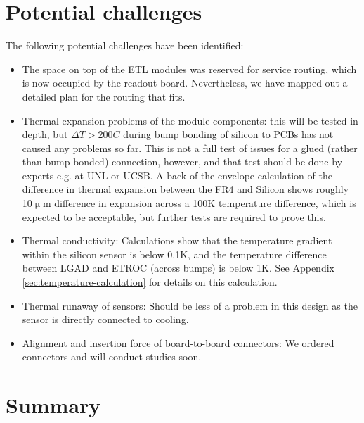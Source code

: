 \documentclass[11pt]{article}
\begin{document}
\section{Potential challenges}

The following potential challenges have been identified:
\begin{itemize}
  \item The space on top of the ETL modules was reserved for service routing, which is now occupied by the readout board. Nevertheless, we have mapped out a detailed plan for the routing that fits.
  \item Thermal expansion problems of the module components: this will be tested in depth, but $\Delta T > 200C$ during bump bonding of silicon to PCBs has not caused any problems so far. This is not a full test of issues for a glued (rather than bump bonded) connection, however, and that test should be done by experts e.g. at UNL or UCSB. A back of the envelope calculation of the difference in thermal expansion between the FR4 and Silicon shows roughly 10$\upmu$m difference in expansion across a 100K temperature difference, which is expected to be acceptable, but further tests are required to prove this.
  \item Thermal conductivity: Calculations show that the temperature gradient within the silicon sensor is below 0.1K, and the temperature difference between LGAD and ETROC (across bumps) is below 1K. See Appendix \ref{sec:temperature-calculation} for details on this calculation.
  \item Thermal runaway of sensors: Should be less of a problem in this design as the sensor is directly connected to cooling.
  \item Alignment and insertion force of board-to-board connectors: We ordered connectors and will conduct studies soon.
\end{itemize}

\section{Summary}
\end{document}

